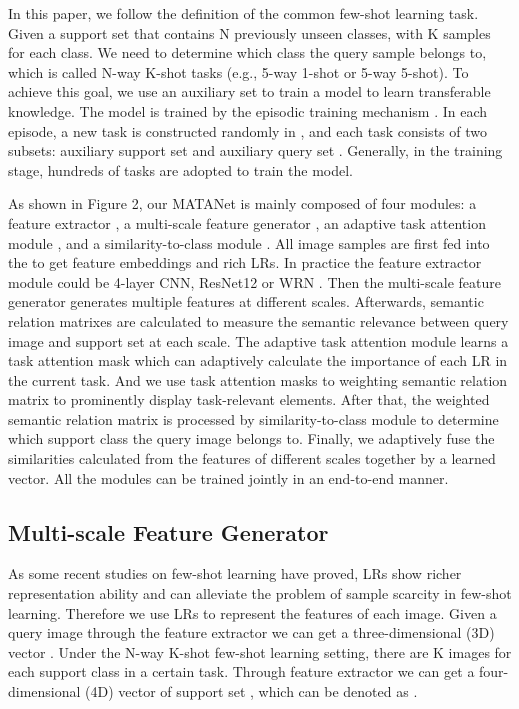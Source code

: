 \documentclass[final]{cvpr}
\begin{document}
	In this paper, we follow the definition of the common few-shot learning task.
	Given a support set that contains N previously unseen classes, with K samples for each class.
	We need to determine which class the query sample belongs to, which is called N-way K-shot tasks (e.g., 5-way 1-shot or 5-way 5-shot).
	To achieve this goal, we use an auxiliary set to train a model to learn transferable knowledge. The model is trained by the episodic training mechanism \cite{vinyals2016matching}. In each episode, a new task is constructed randomly in , and each task consists of two subsets: auxiliary support set  and auxiliary query set . Generally, in the training stage, hundreds of tasks are adopted to train the model.
	
	As shown in Figure 2, our MATANet is mainly composed of four modules: a feature extractor , a multi-scale feature generator , an adaptive task attention module , and a similarity-to-class module . 
	All image samples are first fed into the  to get feature embeddings and rich LRs. In practice the feature extractor module could be 4-layer CNN, ResNet12 \cite{he2016deep} or WRN \cite{zagoruyko2016wide}. Then the multi-scale feature generator generates multiple features at different scales. Afterwards, semantic relation matrixes are calculated to measure the semantic relevance between query image and support set at each scale. The adaptive task attention module learns a task attention mask which can adaptively calculate the importance of each LR in the current task. And we use task attention masks to weighting semantic relation matrix to prominently display task-relevant elements. After that, the weighted semantic relation matrix is processed by similarity-to-class module  to determine which support class the query image belongs to. Finally, we adaptively fuse the similarities calculated from the features of different scales together by a learned vector. All the modules can be trained jointly in an end-to-end manner.
	\subsection{Multi-scale Feature Generator}
	As some recent studies \cite{li2019revisiting,li2019distribution} on few-shot learning have proved, LRs show richer representation ability and can alleviate the problem of sample scarcity in few-shot learning. Therefore we use LRs to represent the features of each image. Given a query image  through the feature extractor we can get a three-dimensional (3D) vector . Under the  N-way K-shot few-shot learning setting, there are K images for each support class in a certain task. Through feature extractor we can get a four-dimensional (4D) vector of support set , which can be denoted as .
	
\end{document}
